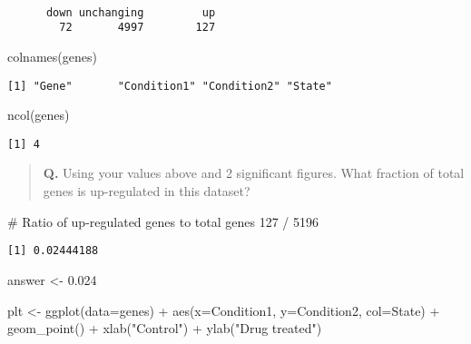 \documentclass[
  letterpaper,
  DIV=11,
  numbers=noendperiod]{scrartcl}
\newenvironment{Shaded}{\begin{snugshade}}{\end{snugshade}}
\newcommand{\AttributeTok}[1]{\textcolor[rgb]{0.40,0.45,0.13}{#1}}
\newcommand{\CommentTok}[1]{\textcolor[rgb]{0.37,0.37,0.37}{#1}}
\newcommand{\DecValTok}[1]{\textcolor[rgb]{0.68,0.00,0.00}{#1}}
\newcommand{\FloatTok}[1]{\textcolor[rgb]{0.68,0.00,0.00}{#1}}
\newcommand{\FunctionTok}[1]{\textcolor[rgb]{0.28,0.35,0.67}{#1}}
\newcommand{\NormalTok}[1]{\textcolor[rgb]{0.00,0.23,0.31}{#1}}
\newcommand{\OtherTok}[1]{\textcolor[rgb]{0.00,0.23,0.31}{#1}}
\newcommand{\SpecialCharTok}[1]{\textcolor[rgb]{0.37,0.37,0.37}{#1}}
\newcommand{\StringTok}[1]{\textcolor[rgb]{0.13,0.47,0.30}{#1}}
\begin{document}
\begin{verbatim}

      down unchanging         up 
        72       4997        127 
\end{verbatim}

\begin{Shaded}
\begin{Highlighting}[]
\FunctionTok{colnames}\NormalTok{(genes)}
\end{Highlighting}
\end{Shaded}

\begin{verbatim}
[1] "Gene"       "Condition1" "Condition2" "State"     
\end{verbatim}

\begin{Shaded}
\begin{Highlighting}[]
\FunctionTok{ncol}\NormalTok{(genes)}
\end{Highlighting}
\end{Shaded}

\begin{verbatim}
[1] 4
\end{verbatim}

\begin{quote}
\textbf{Q.} Using your values above and 2 significant figures. What
fraction of total genes is up-regulated in this dataset?
\end{quote}

\begin{Shaded}
\begin{Highlighting}[]
\CommentTok{\# Ratio of up{-}regulated genes to total genes}
\DecValTok{127} \SpecialCharTok{/} \DecValTok{5196}
\end{Highlighting}
\end{Shaded}

\begin{verbatim}
[1] 0.02444188
\end{verbatim}

\begin{Shaded}
\begin{Highlighting}[]
\NormalTok{answer }\OtherTok{\textless{}{-}} \FloatTok{0.024}
\end{Highlighting}
\end{Shaded}

\begin{Shaded}
\begin{Highlighting}[]
\NormalTok{plt }\OtherTok{\textless{}{-}} \FunctionTok{ggplot}\NormalTok{(}\AttributeTok{data=}\NormalTok{genes) }\SpecialCharTok{+}
  \FunctionTok{aes}\NormalTok{(}\AttributeTok{x=}\NormalTok{Condition1, }\AttributeTok{y=}\NormalTok{Condition2, }\AttributeTok{col=}\NormalTok{State) }\SpecialCharTok{+}
  \FunctionTok{geom\_point}\NormalTok{() }\SpecialCharTok{+}
  \FunctionTok{xlab}\NormalTok{(}\StringTok{"Control"}\NormalTok{) }\SpecialCharTok{+}
  \FunctionTok{ylab}\NormalTok{(}\StringTok{"Drug treated"}\NormalTok{)}
\end{Highlighting}
\end{Shaded}
\end{document}
